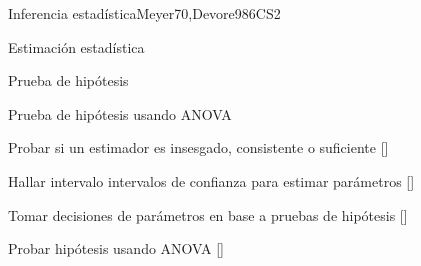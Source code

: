 \begin{syllabus}
\begin{unit}{}{Inferencia estadística}{Meyer70,Devore98}{6}{CS2}
\begin{topics}
      \item Estimación estadística
      \item Prueba de hipótesis
      \item Prueba de hipótesis usando ANOVA
   \end{topics}

   \begin{learningoutcomes}
      \item Probar si un estimador es insesgado, consistente o suficiente [\Usage]
      \item Hallar intervalo intervalos de confianza para estimar parámetros [\Usage]
      \item Tomar decisiones de parámetros en base a pruebas de hipótesis [\Usage]
      \item Probar hipótesis usando ANOVA [\Usage]
   \end{learningoutcomes}
\end{unit}





\begin{coursebibliography}
\end{coursebibliography}

\end{syllabus}
